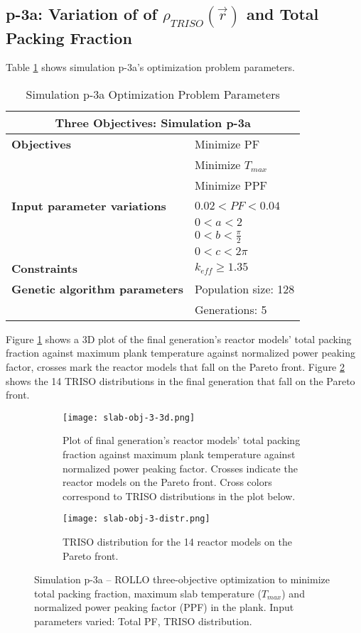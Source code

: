 \subsection{p-3a: Variation of of $\rho_{TRISO}(\vec{r})$ and Total Packing Fraction}
Table \ref{tab:simulationp3a} shows simulation p-3a's optimization problem parameters. 
\begin{table}[htbp]
    \centering
    \onehalfspacing
    \caption{Simulation p-3a Optimization Problem Parameters}
	\label{tab:simulationp3a}
    \footnotesize
    \begin{tabular}{l|p{4cm}}
    \hline 
    \multicolumn{2}{c}{\textbf{Three Objectives: Simulation p-3a}} \\
    \hline 
    \textbf{Objectives} & Minimize PF \\
    & Minimize $T_{max}$ \\
    & Minimize PPF \\
    \hline 
    \textbf{Input parameter variations} & $0.02<PF<0.04$ \\
    & $0<a<2$ \\
    & $0<b<\frac{\pi}{2}$ \\
    & $0<c<2\pi$ \\
    \hline
    \textbf{Constraints} & $k_{eff} \geq 1.35$\\ 
    \hline 
    \textbf{Genetic algorithm parameters} & Population size: 128 \\
    & Generations: 5 \\
    \hline
    \end{tabular}
\end{table}

Figure \ref{fig:slab-obj-3-3d} shows a 3D plot of the final generation's reactor models' 
total packing fraction against maximum plank temperature against normalized power 
peaking factor, crosses mark the reactor models that fall on the Pareto front.
Figure \ref{fig:slab-obj-3-distr} shows the 14 TRISO distributions in 
the final generation that fall on the Pareto front. 
\begin{figure}[htbp]
    \begin{subfigure}{\textwidth}
        \centering
        \texttt{[image: slab-obj-3-3d.png]}
        \caption{Plot of final generation's reactor models' total packing fraction against maximum plank 
        temperature against normalized power peaking factor. Crosses indicate the reactor models on the 
        Pareto front. Cross colors correspond to TRISO distributions in the plot below.}
        \label{fig:slab-obj-3-3d} 
    \end{subfigure}
    \begin{subfigure}{\textwidth}
        \texttt{[image: slab-obj-3-distr.png]}
        \caption{TRISO distribution for the 14 reactor models on the Pareto front.}
        \label{fig:slab-obj-3-distr} 
    \end{subfigure}
    \caption{Simulation p-3a -- ROLLO three-objective optimization to minimize total packing fraction, 
    maximum slab temperature ($T_{max}$) and normalized power peaking factor (PPF) in the plank. 
    Input parameters varied: Total PF, TRISO distribution.}
    \label{fig:slab-obj-3}
\end{figure}

